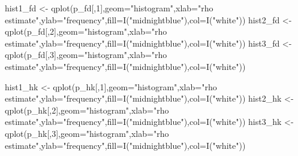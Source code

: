 \documentclass[
]{article}
\newenvironment{Shaded}{\begin{snugshade}}{\end{snugshade}}
\newcommand{\AttributeTok}[1]{\textcolor[rgb]{0.77,0.63,0.00}{#1}}
\newcommand{\DecValTok}[1]{\textcolor[rgb]{0.00,0.00,0.81}{#1}}
\newcommand{\FunctionTok}[1]{\textcolor[rgb]{0.00,0.00,0.00}{#1}}
\newcommand{\NormalTok}[1]{#1}
\newcommand{\OtherTok}[1]{\textcolor[rgb]{0.56,0.35,0.01}{#1}}
\newcommand{\StringTok}[1]{\textcolor[rgb]{0.31,0.60,0.02}{#1}}
\begin{document}
\begin{Shaded}
\begin{Highlighting}[]
\NormalTok{hist1\_fd }\OtherTok{\textless{}{-}} \FunctionTok{qplot}\NormalTok{(p\_fd[,}\DecValTok{1}\NormalTok{],}\AttributeTok{geom=}\StringTok{"histogram"}\NormalTok{,}\AttributeTok{xlab=}\StringTok{"rho estimate"}\NormalTok{,}\AttributeTok{ylab=}\StringTok{"frequency"}\NormalTok{,}\AttributeTok{fill=}\FunctionTok{I}\NormalTok{(}\StringTok{"midnightblue"}\NormalTok{),}\AttributeTok{col=}\FunctionTok{I}\NormalTok{(}\StringTok{"white"}\NormalTok{)) }
\NormalTok{hist2\_fd }\OtherTok{\textless{}{-}} \FunctionTok{qplot}\NormalTok{(p\_fd[,}\DecValTok{2}\NormalTok{],}\AttributeTok{geom=}\StringTok{"histogram"}\NormalTok{,}\AttributeTok{xlab=}\StringTok{"rho estimate"}\NormalTok{,}\AttributeTok{ylab=}\StringTok{"frequency"}\NormalTok{,}\AttributeTok{fill=}\FunctionTok{I}\NormalTok{(}\StringTok{"midnightblue"}\NormalTok{),}\AttributeTok{col=}\FunctionTok{I}\NormalTok{(}\StringTok{"white"}\NormalTok{)) }
\NormalTok{hist3\_fd }\OtherTok{\textless{}{-}} \FunctionTok{qplot}\NormalTok{(p\_fd[,}\DecValTok{3}\NormalTok{],}\AttributeTok{geom=}\StringTok{"histogram"}\NormalTok{,}\AttributeTok{xlab=}\StringTok{"rho estimate"}\NormalTok{,}\AttributeTok{ylab=}\StringTok{"frequency"}\NormalTok{,}\AttributeTok{fill=}\FunctionTok{I}\NormalTok{(}\StringTok{"midnightblue"}\NormalTok{),}\AttributeTok{col=}\FunctionTok{I}\NormalTok{(}\StringTok{"white"}\NormalTok{)) }

\NormalTok{hist1\_hk }\OtherTok{\textless{}{-}} \FunctionTok{qplot}\NormalTok{(p\_hk[,}\DecValTok{1}\NormalTok{],}\AttributeTok{geom=}\StringTok{"histogram"}\NormalTok{,}\AttributeTok{xlab=}\StringTok{"rho estimate"}\NormalTok{,}\AttributeTok{ylab=}\StringTok{"frequency"}\NormalTok{,}\AttributeTok{fill=}\FunctionTok{I}\NormalTok{(}\StringTok{"midnightblue"}\NormalTok{),}\AttributeTok{col=}\FunctionTok{I}\NormalTok{(}\StringTok{"white"}\NormalTok{)) }
\NormalTok{hist2\_hk }\OtherTok{\textless{}{-}} \FunctionTok{qplot}\NormalTok{(p\_hk[,}\DecValTok{2}\NormalTok{],}\AttributeTok{geom=}\StringTok{"histogram"}\NormalTok{,}\AttributeTok{xlab=}\StringTok{"rho estimate"}\NormalTok{,}\AttributeTok{ylab=}\StringTok{"frequency"}\NormalTok{,}\AttributeTok{fill=}\FunctionTok{I}\NormalTok{(}\StringTok{"midnightblue"}\NormalTok{),}\AttributeTok{col=}\FunctionTok{I}\NormalTok{(}\StringTok{"white"}\NormalTok{)) }
\NormalTok{hist3\_hk }\OtherTok{\textless{}{-}} \FunctionTok{qplot}\NormalTok{(p\_hk[,}\DecValTok{3}\NormalTok{],}\AttributeTok{geom=}\StringTok{"histogram"}\NormalTok{,}\AttributeTok{xlab=}\StringTok{"rho estimate"}\NormalTok{,}\AttributeTok{ylab=}\StringTok{"frequency"}\NormalTok{,}\AttributeTok{fill=}\FunctionTok{I}\NormalTok{(}\StringTok{"midnightblue"}\NormalTok{),}\AttributeTok{col=}\FunctionTok{I}\NormalTok{(}\StringTok{"white"}\NormalTok{)) }


\end{Highlighting}
\end{Shaded}
\end{document}
